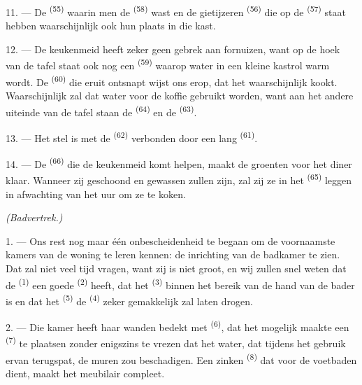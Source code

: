 \VUsaut{4.0mm}
\VUsaut{3.0mm}

11. --- De  \textsuperscript{(55)} waarin men de
 \textsuperscript{(58)} wast en de gietijzeren 
\textsuperscript{(56)} die op de  \textsuperscript{(57)} staat hebben
waarschijnlijk ook hun plaats in die kast.

12. --- De keukenmeid heeft zeker geen gebrek aan fornuizen, want op de hoek van de tafel
staat ook nog een  \textsuperscript{(59)} waarop water in een kleine kastrol
warm wordt. De
 \textsuperscript{(60)} die eruit ontsnapt wijst ons erop, dat het
waarschijnlijk kookt. Waarschijnlijk zal dat water voor de koffie gebruikt worden, want aan
het andere uiteinde van de tafel staan de
 \textsuperscript{(64)} en de 
\textsuperscript{(63)}.

13. --- Het stel is met de  \textsuperscript{(62)} verbonden door een lang
 \textsuperscript{(61)}.

14. --- De  \textsuperscript{(66)} die de keukenmeid komt helpen, maakt de
groenten voor het diner klaar. Wanneer zij geschoond en gewassen zullen zijn, zal zij ze in
het  \textsuperscript{(65)} leggen in afwachting van het uur om ze te koken.

\VUsaut{4.0mm}
{\centering\fontsize{10.2pt}{10.2pt}\selectfont{} \textit{(Badvertrek.)}\par}
\VUsaut{3.0mm}

1. --- Ons rest nog maar één onbescheidenheid te begaan om de voornaamste kamers van de woning
te leren kennen: de inrichting van de badkamer te zien. Dat zal niet veel tijd vragen, want
zij is niet groot, en wij zullen snel weten dat de
 \textsuperscript{(1)} een goede 
\textsuperscript{(2)} heeft, dat het  \textsuperscript{(3)} binnen het
bereik van de hand van de bader is en dat het
 \textsuperscript{(5)} de 
\textsuperscript{(4)} zeker gemakkelijk zal laten drogen.

2. --- Die kamer heeft haar wanden bedekt met  \textsuperscript{(6)}, dat
het mogelijk maakte een  \textsuperscript{(7)} te plaatsen zonder
enigszins te vrezen dat het water, dat tijdens het gebruik ervan terugspat, de muren zou
beschadigen. Een zinken
 \textsuperscript{(8)} dat voor de voetbaden dient, maakt het
meubilair compleet.
\VUsaut{6.0mm}
\VUfilet{22mm}
